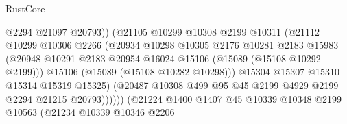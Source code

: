 \begin{lexlean}{RustCore}
\begin{coremodule}
                                        @2294
                                        @21097
                                        @20793))
                                    (@21105
                                      @10299
                                      @10308
                                      @2199
                                      @10311
                                      (@21112
                                        @10299
                                        @10306
                                        @2266
                                        (@20934
                                          @10298
                                          @10305
                                          @2176
                                          @10281
                                          @2183
                                          @15983
                                          (@20948
                                            @10291
                                            @2183
                                            @20954
                                            @16024
                                            @15106
                                            (@15089 (@15108 @10292 @2199)))
                                          @15106
                                          (@15089 (@15108 @10282 @10298)))
                                        @15304
                                        @15307
                                        @15310
                                        @15314
                                        @15319
                                        @15325)
                                      (@20487
                                        @10308
                                        @499
                                        @95
                                        @45
                                        @2199
                                        @4929
                                        @2199
                                        @2294
                                        @21215
                                        @20793))))))
                            (@21224
                              @1400
                              @1407
                              @45
                              @10339
                              @10348
                              @2199
                              @10563
                              (@21234
                                @10339
                                @10346
                                @2206

\end{coremodule}
\end{lexlean}
